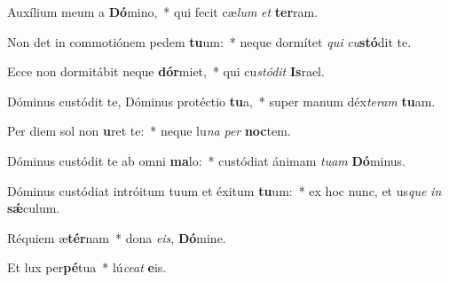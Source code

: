 \item Auxílium meum a \textbf{Dó}mino,~* qui fecit cæ\hspace*{0.03em}\textit{lum} \textit{et} \textbf{ter}ram.
\item Non det in commotiónem pedem \textbf{tu}um:~* neque dormítet \textit{qui} \textit{cu}\textbf{stó}dit te.
\item Ecce non dormitábit neque \textbf{dór}miet,~* qui cu\textit{stódit} \textbf{Is}rael.
\item Dóminus custódit te, Dóminus protéctio \textbf{tu}a,~* super manum déx\textit{teram} \textbf{tu}am.
\item Per diem sol non \textbf{u}ret te:~* neque lu\textit{na} \textit{per} \textbf{noc}tem.
\item Dóminus custódit te ab omni \textbf{ma}lo:~* custódiat ánimam \textit{tuam} \textbf{Dó}minus.
\item Dóminus custódiat intróitum tuum et éxitum \textbf{tu}um:~* ex hoc nunc, et us\hspace*{0.03em}\textit{que} \textit{in} \textbf{sǽ}culum.
\item Réquiem æ\textbf{tér}nam~* dona \textit{eis}, \textbf{Dó}mine.
\item Et lux per\textbf{pé}tua~* lú\hspace*{0.03em}\textit{ceat} \textbf{e}is.